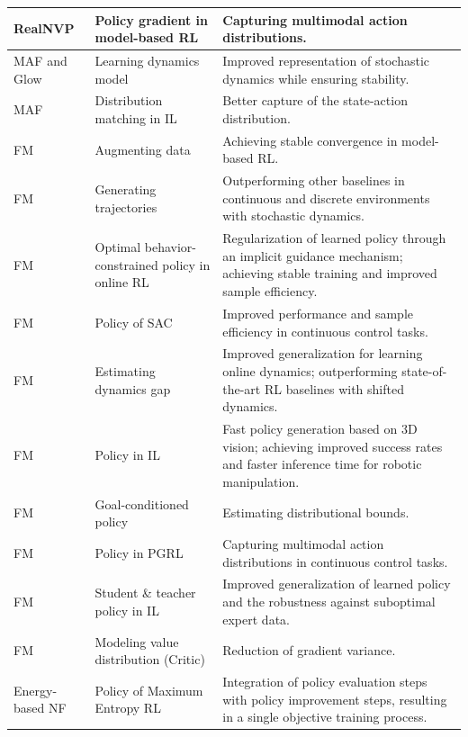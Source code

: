 \begin{xltabular}{\linewidth}{p{3.5cm} p{3.5cm} X}
\hline
RealNVP \citep{Lee2023ImprovingPM} & Policy gradient in model-based RL & Capturing multimodal action distributions. \\
\hline
MAF and Glow \citep{imitationflow2020} & Learning dynamics model & Improved representation of stochastic dynamics while ensuring stability. \\
\hline
MAF \citep{coupledflowimitation2023} & Distribution matching in IL & Better capture of the state-action distribution. \\
\hline
FM \citep{pivezhandi2025fm} & Augmenting data & Achieving stable convergence in model-based RL.\\
\hline
FM \citep{xu2024uncertaintyaware} & Generating trajectories & Outperforming other baselines in continuous
and discrete environments with stochastic dynamics. \\
\hline
FM \citep{lv2025flowbasedpolicy} & Optimal behavior-constrained policy in online RL & Regularization of learned policy through an implicit guidance mechanism; achieving stable training and improved sample efficiency. \\ 
\hline
FM \citep{zhang2025sacflow} & Policy of SAC & Improved performance and sample efficiency in continuous control tasks. \\
\hline
FM \citep{kong2025compositeflowmatchingreinforcement} & Estimating dynamics gap & Improved generalization for learning online dynamics; outperforming state-of-the-art RL baselines with shifted dynamics.\\
\hline
FM \citep{2025flowpolicy} & Policy in IL & Fast policy generation based on 3D vision; achieving improved success rates and faster inference time for robotic manipulation.\\
\hline
FM \citep{rouxel2025extremumflowmatchingoffline} & Goal-conditioned policy & Estimating distributional bounds. \\
\hline
FM \citep{mcallister2025flowmatchingpolicygradients} & Policy in PGRL & Capturing multimodal action distributions in continuous control tasks.\\
\hline
FM \citep{wan2025fmirlflowmatchingrewardmodeling} & Student \& teacher policy in IL & Improved generalization of
learned policy and the robustness against suboptimal expert data.\\
\hline
FM \citep{zhong2025flowcriticbridgingvalueestimation} & Modeling value distribution (Critic) & Reduction of gradient variance. \\
\hline
Energy-based NF \citep{NEURIPS2024_661c37f3} & Policy of Maximum Entropy RL & Integration of policy evaluation steps with policy improvement steps, resulting in a single objective training process. \\

\end{xltabular}
